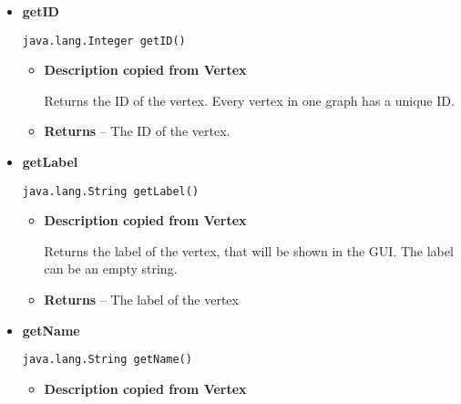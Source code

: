 {{{{{{{{{{{{{{{{\begin{itemize}
{\begin{itemize}
{Adds the vertex to a \texttt{\small FastGraphAccessor}{\small 
{}}.
}
\item{
{\bf  Parameters}
  \begin{itemize}
   \item{
\texttt{fga} -- The \texttt{\small FastGraphAccessor}{\small 
{}} to whom this vertex will be added.}
  \end{itemize}
}%
\end{itemize}
}%
\item{ 
{\bf  getID}\\
\begin{lstlisting}[frame=none]
java.lang.Integer getID()\end{lstlisting} %
\begin{itemize}
\item{
{\bf  Description copied from Vertex{\small {}} }

Returns the ID of the vertex. Every vertex in one graph has a unique ID.
}
\item{{\bf  Returns} -- 
The ID of the vertex. 
}%
\end{itemize}
}%
\item{ 
{\bf  getLabel}\\
\begin{lstlisting}[frame=none]
java.lang.String getLabel()\end{lstlisting} %
\begin{itemize}
\item{
{\bf  Description copied from Vertex{\small {}} }

Returns the label of the vertex, that will be shown in the GUI. The label can be an empty string.
}
\item{{\bf  Returns} -- 
The label of the vertex 
}%
\end{itemize}
}%
\item{ 
{\bf  getName}\\
\begin{lstlisting}[frame=none]
java.lang.String getName()\end{lstlisting} %
\begin{itemize}
\item{
{\bf  Description copied from Vertex{\small {}} }

}
\end{itemize}}
\end{itemize}}}}}}}}}}}}}}}}}
